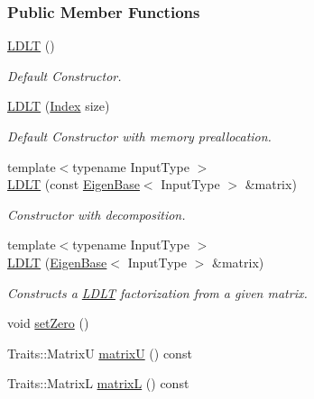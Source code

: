 \subsubsection*{Public Member Functions}
\begin{DoxyCompactItemize}
\item 
\hyperlink{group___cholesky___module_a2e06dedd2651649c5b251fbf9ba4e7d4}{L\+D\+LT} ()
\begin{DoxyCompactList}\small\item\em Default Constructor. \end{DoxyCompactList}\item 
\hyperlink{group___cholesky___module_a154aa41bd2460199d48861eaf5e4f597}{L\+D\+LT} (\hyperlink{group___cholesky___module_ad9c57eb2fb3bbccd51b9d2e111bea355}{Index} size)
\begin{DoxyCompactList}\small\item\em Default Constructor with memory preallocation. \end{DoxyCompactList}\item 
{\footnotesize template$<$typename Input\+Type $>$ }\\\hyperlink{group___cholesky___module_ad0e8d2131ea1a626a08d98e9effb1cc5}{L\+D\+LT} (const \hyperlink{group___core___module_struct_eigen_1_1_eigen_base}{Eigen\+Base}$<$ Input\+Type $>$ \&matrix)
\begin{DoxyCompactList}\small\item\em Constructor with decomposition. \end{DoxyCompactList}\item 
{\footnotesize template$<$typename Input\+Type $>$ }\\\hyperlink{group___cholesky___module_adf853d6cbbc49f3535a44439bca344d9}{L\+D\+LT} (\hyperlink{group___core___module_struct_eigen_1_1_eigen_base}{Eigen\+Base}$<$ Input\+Type $>$ \&matrix)
\begin{DoxyCompactList}\small\item\em Constructs a \hyperlink{group___cholesky___module_class_eigen_1_1_l_d_l_t}{L\+D\+LT} factorization from a given matrix. \end{DoxyCompactList}\item 
void \hyperlink{group___cholesky___module_a776d0ab6c980847297d25b03b5d2216a}{set\+Zero} ()
\item 
Traits\+::\+MatrixU \hyperlink{group___cholesky___module_a54838a2e31e53bbe4dcb78b5e80c8484}{matrixU} () const
\item 
Traits\+::\+MatrixL \hyperlink{group___cholesky___module_af0e6a0df5679873b42cf82a372dd8ddb}{matrixL} () const

\end{DoxyCompactItemize}
